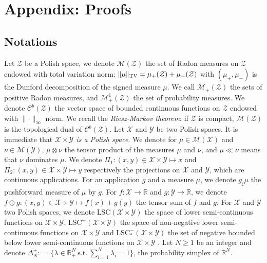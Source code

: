 
\section{Appendix: Proofs}
\label{sec:proofs}

\subsection{Notations}


Let $\mathcal{Z}$ be a Polish space, we denote $\mathcal{M}(\mathcal{Z})$ the set of Radon measures on $\mathcal{Z}$ endowed with total variation norm: $\lVert\mu\rVert_{\textsc{TV}}=\mu_+(\mathcal{Z})+\mu_-(\mathcal{Z})$ with $(\mu_+,\mu_-)$ is the Dunford decomposition of the signed measure $\mu$. We call $\mathcal{M}_+(\mathcal{Z})$ the sets of positive Radon measures, and  $\mathcal{M}^1_+(\mathcal{Z})$ the set of probability measures. We denote $\mathcal{C}^b(\mathcal{Z})$ the vector space of bounded continuous functions on $\mathcal{Z}$ endowed with $\lVert\cdot \rVert_\infty$ norm. We recall the \textit{Riesz-Markov theorem}: if $\mathcal{Z}$ is compact, $\mathcal{M}(\mathcal{Z})$ is the topological dual of $\mathcal{C}^b(\mathcal{Z})$. Let $\mathcal{X}$ and $\mathcal{Y}$ be two Polish spaces. It is immediate  that \textit{$\mathcal{X}\times\mathcal{Y}$ is a Polish space}.  We denote for $\mu\in\mathcal{M}(\mathcal{X})$ and $\nu\in\mathcal{M}(\mathcal{Y})$, $\mu\otimes\nu$ the tensor product of the measures $\mu$ and $\nu$, and $\mu\ll\nu$ means that $\nu$ dominates $\mu$.  We denote $\Pi_1:(x,y)\in\mathcal{X}\times\mathcal{Y}\mapsto x$ and $\Pi_2:(x,y)\in\mathcal{X}\times\mathcal{Y}\mapsto y$ respectively the projections on $\mathcal{X}$ and  $\mathcal{Y}$, which are continuous applications. For an application $g$ and a measure $\mu$, we denote $g_\sharp\mu$ the pushforward measure of $\mu$ by $g$. For $f:\mathcal{X}\rightarrow\mathbb{R}$ and $g:\mathcal{Y}\rightarrow\mathbb{R}$, we denote $f\oplus g:(x,y)\in\mathcal{X}\times\mathcal{Y}\mapsto f(x)+g(y)$ the tensor sum of $f$ and $g$. For  $\mathcal{X}$ and $\mathcal{Y}$ two Polish spaces, we denote $\text{LSC}(\mathcal{X}\times\mathcal{Y})$ the space of lower semi-continuous functions on $\mathcal{X}\times\mathcal{Y}$,  $\mathrm{LSC}^+(\mathcal{X}\times\mathcal{Y})$ the space of non-negative lower semi-continuous functions on $\mathcal{X}\times\mathcal{Y}$ and $\mathrm{LSC}^-_{*}(\mathcal{X}\times\mathcal{Y})$ the set of negative bounded below lower semi-continuous functions on $\mathcal{X}\times\mathcal{Y}$ .  Let $N\geq 1$ be an integer and denote $\Delta_N^{+}: = \{\lambda\in\mathbb{R}_+^N~\mathrm{s.t.}~\sum_{i=1}^N\lambda_i=1\}$, the probability simplex of $\mathbb{R}^N$.
